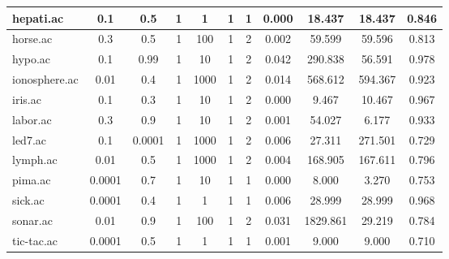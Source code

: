 \begin{table}[htbp]
\begin{tabular}{|l|c|c|c|c|c|c|c|c|c|c|}
		\hline
		hepati.ac      & 0.1      & 0.5         & 1              & 1                   & 1             & 1             & 0.000          & 18.437         & 18.437         & 0.846          \\
		\hline
		horse.ac       & 0.3      & 0.5         & 1              & 100                 & 1             & 2             & 0.002          & 59.599         & 59.596         & 0.813          \\
		\hline
		hypo.ac        & 0.1      & 0.99        & 1              & 10                  & 1             & 2             & 0.042          & 290.838        & 56.591         & 0.978          \\
		\hline
		ionosphere.ac  & 0.01     & 0.4         & 1              & 1000                & 1             & 2             & 0.014          & 568.612        & 594.367        & 0.923          \\
		\hline
		iris.ac        & 0.1      & 0.3         & 1              & 10                  & 1             & 2             & 0.000          & 9.467          & 10.467         & 0.967          \\
		\hline
		labor.ac       & 0.3      & 0.9         & 1              & 10                  & 1             & 2             & 0.001          & 54.027         & 6.177          & 0.933          \\
		\hline
		led7.ac        & 0.1      & 0.0001      & 1              & 1000                & 1             & 2             & 0.006          & 27.311         & 271.501        & 0.729          \\
		\hline
		lymph.ac       & 0.01     & 0.5         & 1              & 1000                & 1             & 2             & 0.004          & 168.905        & 167.611        & 0.796          \\
		\hline
		pima.ac        & 0.0001   & 0.7         & 1              & 10                  & 1             & 1             & 0.000          & 8.000          & 3.270          & 0.753          \\
		\hline
		sick.ac        & 0.0001   & 0.4         & 1              & 1                   & 1             & 1             & 0.006          & 28.999         & 28.999         & 0.968          \\
		\hline
		sonar.ac       & 0.01     & 0.9         & 1              & 100                 & 1             & 2             & 0.031          & 1829.861       & 29.219         & 0.784          \\
		\hline
		tic-tac.ac     & 0.0001   & 0.5         & 1              & 1                   & 1             & 1             & 0.001          & 9.000          & 9.000          & 0.710          \\

\end{tabular}
\end{table}
